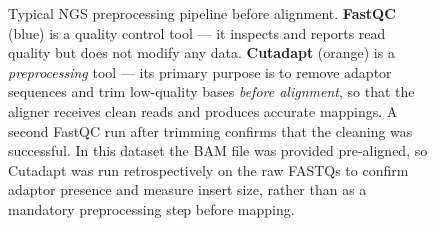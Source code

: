 \begin{figure}[H]
{%
}%
\caption{Typical NGS preprocessing pipeline before alignment.
\textbf{FastQC} (blue) is a quality control tool --- it inspects and reports read
quality but does not modify any data.
\textbf{Cutadapt} (orange) is a \emph{preprocessing} tool --- its primary purpose
is to remove adaptor sequences and trim low-quality bases \emph{before alignment},
so that the aligner receives clean reads and produces accurate mappings.
A second FastQC run after trimming confirms that the cleaning was successful.
In this dataset the BAM file was provided pre-aligned, so Cutadapt was run
retrospectively on the raw FASTQs to confirm adaptor presence and measure
insert size, rather than as a mandatory preprocessing step before mapping.}
\label{fig:ngs-pipeline}
\end{figure}
